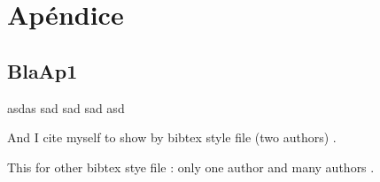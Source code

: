 \chapter{Ap\'endice}
\label{chap:apendice1}

\section{BlaAp1}

asdas sad
sad
sad
asd

And I cite myself to show by bibtex style file (two authors) \cite{Commowick_MICCAI_2007}.

This for other bibtex stye file : only one author \cite{Oakes_RStat_1999} and many authors \cite{Guimond_CVIU_2000}.